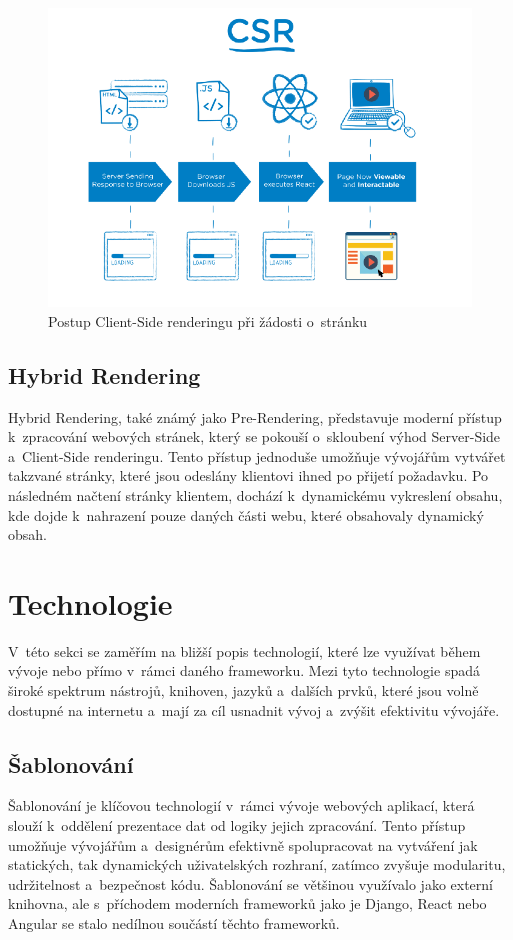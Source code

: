 \begin{figure}[H]
    \centering
    \includegraphics[width=1.0\textwidth]{figures/client-side-rendering}
    \caption{Postup Client-Side renderingu při žádosti o~stránku \cite{rendering-diff}}
    \label{fig:client-side-rendering}
\end{figure}

\subsection{Hybrid Rendering}
\label{subsec:dev-request-processing-hybrid-rendering}
Hybrid Rendering, také známý jako Pre-Rendering, představuje moderní přístup k~zpracování webových stránek, který se pokouší o~skloubení výhod Server-Side a~Client-Side renderingu. Tento přístup jednoduše umožňuje vývojářům vytvářet takzvané  stránky, které jsou odeslány klientovi ihned po přijetí požadavku. Po následném načtení stránky klientem, dochází k~dynamickému vykreslení obsahu, kde dojde k~nahrazení pouze daných části webu, které obsahovaly dynamický obsah.

\section{Technologie}
\label{sec:dev-technology}
V~této sekci se zaměřím na bližší popis technologií, které lze využívat během vývoje nebo přímo v~rámci daného frameworku. Mezi tyto technologie spadá široké spektrum nástrojů, knihoven, jazyků a~dalších prvků, které jsou volně dostupné na internetu a~mají za cíl usnadnit vývoj a~zvýšit efektivitu vývojáře.

\subsection{Šablonování}
\label{subsec:dev-technology-templating}
Šablonování je klíčovou technologií v~rámci vývoje webových aplikací, která slouží k~oddělení prezentace dat od logiky jejich zpracování. Tento přístup umožňuje vývojářům a~designérům efektivně spolupracovat na vytváření jak statických, tak dynamických uživatelských rozhraní, zatímco zvyšuje modularitu, udržitelnost a~bezpečnost kódu. Šablonování se většinou využívalo jako externí knihovna, ale s~příchodem moderních frameworků jako je Django, React nebo Angular se stalo nedílnou součástí těchto frameworků.

